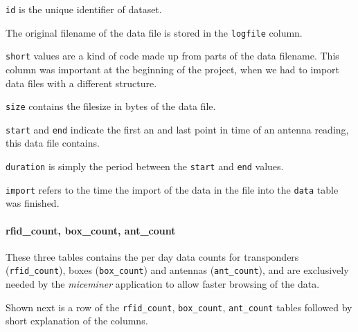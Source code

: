 \begin{mydesc}
	\item \lstinline|id| is the unique identifier of dataset.
	\item The original filename of the data file is stored in the \lstinline|logfile| column.
	\item \lstinline|short| values are a kind of code made up from parts of the data filename. This column was important at the beginning of the project, when we had to import data files with a different structure.
	\item \lstinline|size| contains the filesize in bytes of the data file.
	\item \lstinline|start| and \lstinline|end| indicate the first an and last point in time of an antenna reading, this data file contains.
	\item \lstinline|duration| is simply the period between the \lstinline|start| and \lstinline|end| values.
	\item \lstinline|import| refers to the time the import of the data in the file into the \lstinline|data| table was finished.
\end{mydesc}

\paragraph{rfid\_count, box\_count, ant\_count}
\label{para:counts}

These three tables contains the per day data counts for transponders (\lstinline|rfid_count|), boxes (\lstinline|box_count|) and antennas (\lstinline|ant_count|), and are exclusively needed by the \textit{miceminer} application to allow faster browsing of the data.

Shown next is a row of the \lstinline|rfid_count|, \lstinline|box_count|, \lstinline|ant_count| tables followed by short explanation of the columns.

